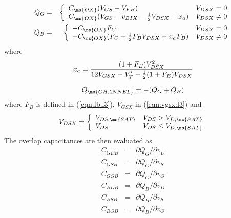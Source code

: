 \begin{eqnarray}
      Q_G &=& \left\{ \begin{array}{ll}
            C_{\ms{OX}} (V_{GS}-V_{FB}) &V_{DSX} = 0 \\
             C_{\ms{OX}} ( V_{GS} - v_{BIX} - \frac{1}{2} V_{DSX} + x_a )
            &V_{DSX} \ne 0
            \end{array} \right. %
            \\
       Q_B &=& \left\{ \begin{array}{ll}
            -C_{\ms{OX}} F_C &V_{DSX} = 0 \\
             -C_{\ms{OX}} ( F_C + \frac{1}{2} F_B V_{DSX}
             - x_a F_B ) &V_{DSX} \ne 0
            \end{array} \right. %
\end{eqnarray}
where
\begin{equation}
      x_a  = {{\textstyle (1+F_B) V_{DSX}^2}\over
              {12 V_{GSX} - V'_T - \frac{1}{2} (1+F_B) V_{DSX} }}
\end{equation}


\begin{equation}
Q_{\ms{CHANNEL}} = -( Q_G + Q_B )
\end{equation}
where $F_B$ is defined in (\ref{eqn:fb:l3}), $V_{GSX}$ in
(\ref{eqn:vgsx:l3}) and
\begin{equation}
      V_{DSX}   = \left\{ \begin{array}{ll}
                    V_{DS,\ms{SAT}} & V_{DS} > V_{D,\ms{SAT}}\\
                    V_{DS} & V_{DS} \le V_{D,\ms{SAT}}
                    \end{array} \right. %
\end{equation}
The overlap capacitances are then evaluated as
\begin{eqnarray}
    C_{GDB}  &=& \partial Q_G / \partial v_D\\
    C_{GSB}  &=& \partial Q_G / \partial v_S\\
    C_{GGB}  &=& \partial Q_G / \partial v_G\\
    C_{BDB}  &=& \partial Q_B / \partial v_D\\
    C_{BSB}  &=& \partial Q_B / \partial v_S\\
    C_{BGB}  &=& \partial Q_B / \partial v_G
\end{eqnarray}

